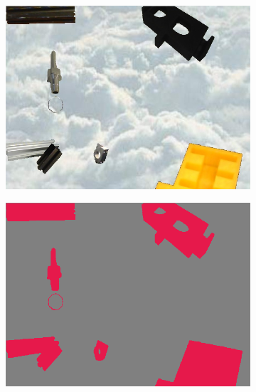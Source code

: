 \begin{figure}[h]
\begin{subfigure}{.24\textwidth}
			\includegraphics[width=1\linewidth]{images/sample_predictions/00017}
		\end{subfigure}
		\begin{subfigure}{.24\textwidth}
			\centering
			\includegraphics[width=1\linewidth]{images/sample_predictions/00017_binary_gt}
		\end{subfigure}
		\begin{subfigure}{.24\textwidth}
			\centering

\end{subfigure}
\end{figure}
